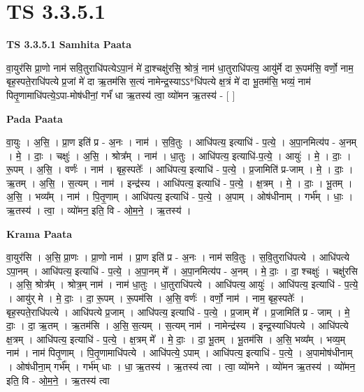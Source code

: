 \documentclass[17pt]{extarticle}
\begin{document}
\section{ TS 3.3.5.1 }

\textbf{TS 3.3.5.1 } \newline
\textbf{Samhita Paata} \newline

वा॒युर॑सि प्रा॒णो नाम॑ सवि॒तुराधि॑पत्येऽपा॒नं मे॑ दा॒श्चक्षु॑रसि॒ श्रोत्रं॒ नाम॑ धा॒तुराधि॑पत्य॒ आयु॑र्मे दा रू॒पम॑सि॒ वर्णो॒ नाम॒ बृह॒स्पते॒राधि॑पत्ये प्र॒जां मे॑ दा ऋ॒तम॑सि स॒त्यं नामेन्द्र॒स्याऽऽ*धि॑पत्ये क्ष॒त्रं मे॑ दा भू॒तम॑सि॒ भव्यं॒ नाम॑ पितृ॒णामाधि॑पत्ये॒ऽपा-मोष॑धीनां॒ गर्भं॑ धा ऋ॒तस्य॑ त्वा॒ व्यो॑मन ऋ॒तस्य॑ - [  ] \newline

\textbf{Pada Paata} \newline

वा॒युः । अ॒सि॒ । प्रा॒ण इति॑ प्र - अ॒नः । नाम॑ । स॒वि॒तुः । आधि॑पत्य॒ इत्याधि॑ - प॒त्ये॒ । अ॒पा॒नमित्य॑प - अ॒नम् । मे॒ । दाः॒ । चक्षुः॑ । अ॒सि॒ । श्रोत्र᳚म् । नाम॑ । धा॒तुः । आधि॑पत्य॒ इत्याधि॑-प॒त्ये॒ । आयुः॑ । मे॒ । दाः॒ । रू॒पम् । अ॒सि॒ । वर्णः॑ । नाम॑ । बृह॒स्पतेः᳚ । आधि॑पत्य॒ इत्याधि॑ - प॒त्ये॒ । प्र॒जामिति॑ प्र-जाम् । मे॒ । दाः॒ । ऋ॒तम् । अ॒सि॒ । स॒त्यम् । नाम॑ । इन्द्र॑स्य । आधि॑पत्य॒ इत्याधि॑ - प॒त्ये॒ । क्ष॒त्रम् । मे॒ । दाः॒ । भू॒तम् । अ॒सि॒ । भव्य᳚म् । नाम॑ । पि॒तृ॒णाम् । आधि॑पत्य॒ इत्याधि॑ - प॒त्ये॒ । अ॒पाम् । ओष॑धीनाम् । गर्भ᳚म् । धाः॒ । ऋ॒तस्य॑ । त्वा॒ । व्यो॑मन॒ इति॒ वि - ओ॒म॒ने॒ । ऋ॒तस्य॑ ।  \newline


\textbf{Krama Paata} \newline

वा॒युर॑सि । अ॒सि॒ प्रा॒णः । प्रा॒णो नाम॑ । प्रा॒ण इति॑ प्र - अ॒नः । नाम॑ सवि॒तुः । स॒वि॒तुराधि॑पत्ये । आधि॑पत्ये ऽपा॒नम् । आधि॑पत्य॒ इत्याधि॑ - प॒त्ये॒ । अ॒पा॒नम् मे᳚ । अ॒पा॒नमित्य॑प - अ॒नम् । मे॒ दाः॒ । दा॒ श्चक्षुः॑ । चक्षु॑रसि । अ॒सि॒ श्रोत्र᳚म् । श्रोत्र॒म् नाम॑ । नाम॑ धा॒तुः । धा॒तुराधि॑पत्ये । आधि॑पत्य॒ आयुः॑ । आधि॑पत्य॒ इत्याधि॑ - प॒त्ये॒ । आयु॑र् मे । मे॒ दाः॒ । दा॒ रू॒पम् । रू॒पम॑सि । अ॒सि॒ वर्णः॑ । वर्णो॒ नाम॑ । नाम॒ बृह॒स्पतेः᳚ । बृह॒स्पते॒राधि॑पत्ये । आधि॑पत्ये प्र॒जाम् । आधि॑पत्य॒ इत्याधि॑ - प॒त्ये॒ । प्र॒जाम् मे᳚ । प्र॒जामिति॑ प्र - जाम् । मे॒ दाः॒ । दा॒ ऋ॒तम् । ऋ॒तम॑सि । अ॒सि॒ स॒त्यम् । स॒त्यम् नाम॑ । नामेन्द्र॑स्य । इन्द्र॒स्याधि॑पत्ये । आधि॑पत्ये क्ष॒त्रम् । आधि॑पत्य॒ इत्याधि॑ - प॒त्ये॒ । क्ष॒त्रम् मे᳚ । मे॒ दाः॒ । दा॒ भू॒तम् । भू॒तम॑सि । अ॒सि॒ भव्य᳚म् । भव्य॒म् नाम॑ । नाम॑ पितृ॒णाम् । पि॒तृ॒णामाधि॑पत्ये । आधि॑पत्ये॒ ऽपाम् । आधि॑पत्य॒ इत्याधि॑ - प॒त्ये॒ । अ॒पामोष॑धीनाम् । ओष॑धीना॒म् गर्भ᳚म् । गर्भ॑म् धाः । धा॒ ऋ॒तस्य॑ । ऋ॒तस्य॑ त्वा । त्वा॒ व्यो॑मने । व्यो॑मन ऋ॒तस्य॑ । व्यो॑मन॒ इति॒ वि - ओ॒म॒ने॒ । ऋ॒तस्य॑ त्वा \newline
\end{document}
